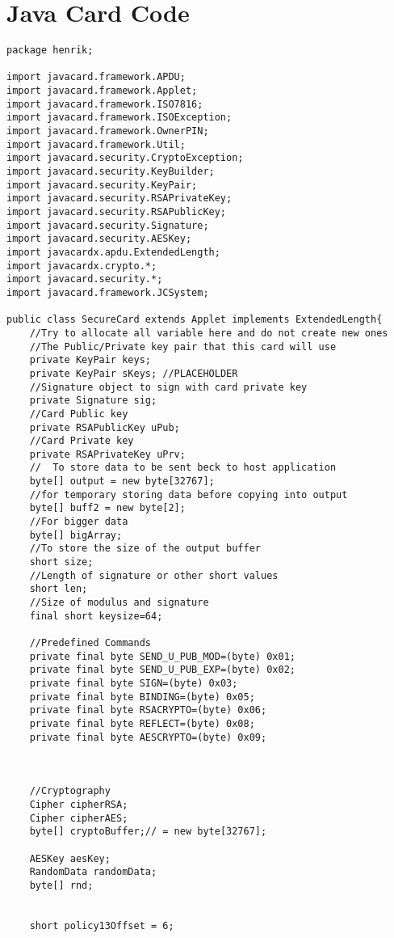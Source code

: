 \chapter{Java Card Code}
\label{app:A}
\begin{lstlisting}[caption=SecureCard.java.,breaklines=true,breakatwhitespace=false, label=lst:SecureCard,escapechar=!]
package henrik;

import javacard.framework.APDU;
import javacard.framework.Applet;
import javacard.framework.ISO7816;
import javacard.framework.ISOException;
import javacard.framework.OwnerPIN;
import javacard.framework.Util;
import javacard.security.CryptoException;
import javacard.security.KeyBuilder;
import javacard.security.KeyPair;
import javacard.security.RSAPrivateKey;
import javacard.security.RSAPublicKey;
import javacard.security.Signature;
import javacard.security.AESKey;
import javacardx.apdu.ExtendedLength;
import javacardx.crypto.*;
import javacard.security.*;
import javacard.framework.JCSystem;

public class SecureCard extends Applet implements ExtendedLength{
	//Try to allocate all variable here and do not create new ones
	//The Public/Private key pair that this card will use
	private KeyPair keys;
	private KeyPair sKeys; //PLACEHOLDER
	//Signature object to sign with card private key
	private Signature sig;
	//Card Public key
	private RSAPublicKey uPub;
    //Card Private key
	private RSAPrivateKey uPrv;
    //	To store data to be sent beck to host application
	byte[] output = new byte[32767];
	//for temporary storing data before copying into output
	byte[] buff2 = new byte[2];
	//For bigger data
	byte[] bigArray;
	//To store the size of the output buffer
	short size;
	//Length of signature or other short values
	short len;
	//Size of modulus and signature
	final short keysize=64;

	//Predefined Commands
	private final byte SEND_U_PUB_MOD=(byte) 0x01;
	private final byte SEND_U_PUB_EXP=(byte) 0x02;
	private final byte SIGN=(byte) 0x03;
	private final byte BINDING=(byte) 0x05;
	private final byte RSACRYPTO=(byte) 0x06;
	private final byte REFLECT=(byte) 0x08;
	private final byte AESCRYPTO=(byte) 0x09;



	//Cryptography
	Cipher cipherRSA;
	Cipher cipherAES;
	byte[] cryptoBuffer;// = new byte[32767];

	AESKey aesKey;
	RandomData randomData;
	byte[] rnd;


	short policy13Offset = 6;



\end{lstlisting}
